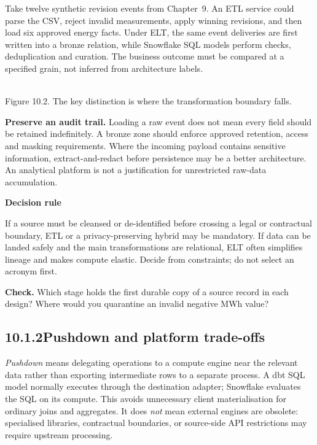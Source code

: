 \documentclass[11pt,twoside]{article}
\newcommand{\topic}[2]{\subsection*{#1\quad #2}}
\begin{document}
Take twelve synthetic revision events from Chapter~9. An ETL service could parse the CSV, reject invalid measurements, apply winning revisions, and then load six approved energy facts. Under ELT, the same event deliveries are first written into a bronze relation, while Snowflake SQL models perform checks, deduplication and curation. The business outcome must be compared at a specified grain, not inferred from architecture labels.
\begin{center}\\{\fontsize{8}{9}\selectfont\color{inkgray}Figure 10.2. The key distinction is where the transformation boundary falls.}\end{center}
\textbf{Preserve an audit trail.} Loading a raw event does not mean every field should be retained indefinitely. A bronze zone should enforce approved retention, access and masking requirements. Where the incoming payload contains sensitive information, extract-and-redact before persistence may be a better architecture. An analytical platform is not a justification for unrestricted raw-data accumulation.
\begin{whitebox}\textbf{Decision rule}\par
If a source must be cleansed or de-identified before crossing a legal or contractual boundary, ETL or a privacy-preserving hybrid may be mandatory. If data can be landed safely and the main transformations are relational, ELT often simplifies lineage and makes compute elastic. Decide from constraints; do not select an acronym first.\end{whitebox}
\textbf{Check.} Which stage holds the first durable copy of a source record in each design? Where would you quarantine an invalid negative MWh value?
\newpage
\topic{10.1.2}{Pushdown and platform trade-offs}
\emph{Pushdown} means delegating operations to a compute engine near the relevant data rather than exporting intermediate rows to a separate process. A dbt SQL model normally executes through the destination adapter; Snowflake evaluates the SQL on its compute. This avoids unnecessary client materialisation for ordinary joins and aggregates. It does \emph{not} mean external engines are obsolete: specialised libraries, contractual boundaries, or source-side API restrictions may require upstream processing.
\end{document}
